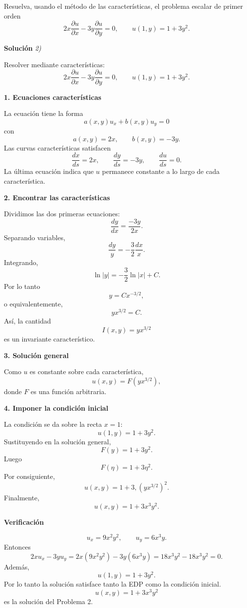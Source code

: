 \documentclass[11pt,spanish]{article}
\newcounter{problema}
\newcommand{\prob}{\stepcounter{problema} \vspace{.5cm} \noindent{\bf Problema \arabic{problema}: }}
\begin{document}
\prob Resuelva, usando el método de las características, el problema escalar de primer orden
\[
2x\frac{\partial u}{\partial x} - 3y\frac{\partial u}{\partial y} = 0,\qquad u(1,y)=1+3y^2.
\]

\vspace{0.5cm}
{\bf Soluci\'on }{\em 2)}
\vspace{0.5cm}

Resolver mediante características:
$$
2x\frac{\partial u}{\partial x}-3y\frac{\partial u}{\partial y}=0,
\qquad
u(1,y)=1+3y^2.
$$

{\bf 1. Ecuaciones características}

La ecuación tiene la forma
$$
a(x,y)u_x+b(x,y)u_y=0
$$
con
$$
a(x,y)=2x,\qquad b(x,y)=-3y.
$$
Las curvas características satisfacen
$$
\frac{dx}{ds}=2x,
\qquad
\frac{dy}{ds}=-3y,
\qquad
\frac{du}{ds}=0.
$$
La última ecuación indica que $u$ permanece constante a lo largo de cada característica.

{\bf 2. Encontrar las características}

Dividimos las dos primeras ecuaciones:
$$
\frac{dy}{dx}
=
\frac{-3y}{2x}.
$$
Separando variables,
$$
\frac{dy}{y}
=
-\frac32\frac{dx}{x}.
$$
Integrando,
$$
\ln|y|
=
-\frac32\ln|x|+C.
$$
Por lo tanto
$$
y=Cx^{-3/2},
$$
o equivalentemente,
$$
yx^{3/2}=C.
$$
Así, la cantidad
$$
\boxed{I(x,y)=yx^{3/2}}
$$
es un invariante característico.

{\bf 3. Solución general}

Como $u$ es constante sobre cada característica,
$$
u(x,y)=F(yx^{3/2}),
$$
donde $F$ es una función arbitraria.

{\bf 4. Imponer la condición inicial}

La condición se da sobre la recta $x=1$:
$$
u(1,y)=1+3y^2.
$$
Sustituyendo en la solución general,
$$
F(y)=1+3y^2.
$$
Luego
$$
F(\eta)=1+3\eta^2.
$$
Por consiguiente,
$$
u(x,y)
=
1+3,(yx^{3/2})^2.
$$
Finalmente,
$$
\boxed{
u(x,y)=1+3x^3y^2.
}
$$

{\bf Verificación}

$$
u_x=9x^2y^2,
\qquad
u_y=6x^3y.
$$
Entonces
$$
2xu_x-3yu_y
=
2x(9x^2y^2)-3y(6x^3y)
=
18x^3y^2-18x^3y^2
=
0.
$$
Además,
$$
u(1,y)=1+3y^2.
$$
Por lo tanto la solución satisface tanto la EDP como la condición inicial.
$$
\boxed{u(x,y)=1+3x^3y^2}
$$
es la solución del Problema 2.
\end{document}

